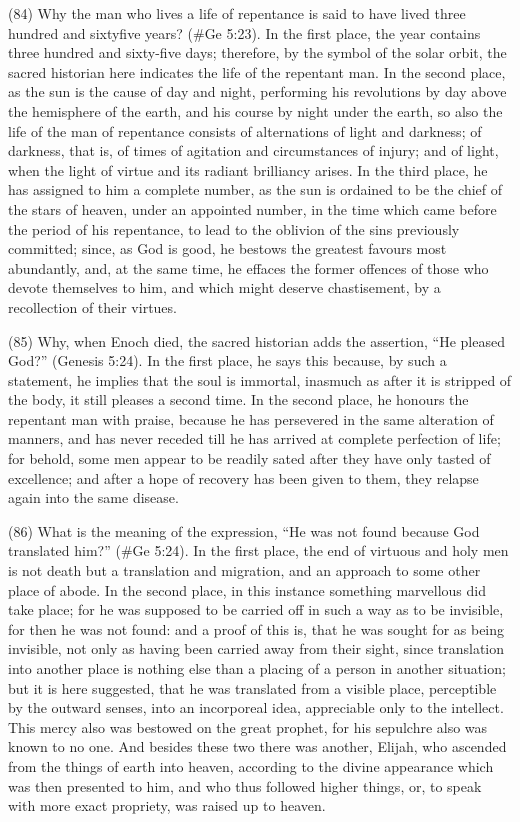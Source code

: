(84) Why the man who lives a life of repentance is said to have lived three hundred and sixtyfive
years? (\#Ge 5:23). In the first place, the year contains three hundred and sixty-five days;
therefore, by the symbol of the solar orbit, the sacred historian here indicates the life of the
repentant man. In the second place, as the sun is the cause of day and night, performing his
revolutions by day above the hemisphere of the earth, and his course by night under the earth, so
also the life of the man of repentance consists of alternations of light and darkness; of darkness,
that is, of times of agitation and circumstances of injury; and of light, when the light of virtue and its
radiant brilliancy arises. In the third place, he has assigned to him a complete number, as the sun
is ordained to be the chief of the stars of heaven, under an appointed number, in the time which
came before the period of his repentance, to lead to the oblivion of the sins previously committed;
since, as God is good, he bestows the greatest favours most abundantly, and, at the same time,
he effaces the former offences of those who devote themselves to him, and which might deserve
chastisement, by a recollection of their virtues.

(85) Why, when Enoch died, the sacred historian adds the assertion, ``He pleased God?'' (Genesis
5:24). In the first place, he says this because, by such a statement, he implies that the soul is
immortal, inasmuch as after it is stripped of the body, it still pleases a second time. In the second
place, he honours the repentant man with praise, because he has persevered in the same
alteration of manners, and has never receded till he has arrived at complete perfection of life; for
behold, some men appear to be readily sated after they have only tasted of excellence; and after a
hope of recovery has been given to them, they relapse again into the same disease.

(86) What is the meaning of the expression, ``He was not found because God translated him?''
(\#Ge 5:24). In the first place, the end of virtuous and holy men is not death but a translation
and migration, and an approach to some other place of abode. In the second place, in this instance
something marvellous did take place; for he was supposed to be carried off in such a way as to be
invisible, for then he was not found: and a proof of this is, that he was sought for as being invisible,
not only as having been carried away from their sight, since translation into another place is
nothing else than a placing of a person in another situation; but it is here suggested, that he was
translated from a visible place, perceptible by the outward senses, into an incorporeal idea,
appreciable only to the intellect. This mercy also was bestowed on the great prophet, for his
sepulchre also was known to no one. And besides these two there was another, Elijah, who
ascended from the things of earth into heaven, according to the divine appearance which was then
presented to him, and who thus followed higher things, or, to speak with more exact propriety, was
raised up to heaven.

